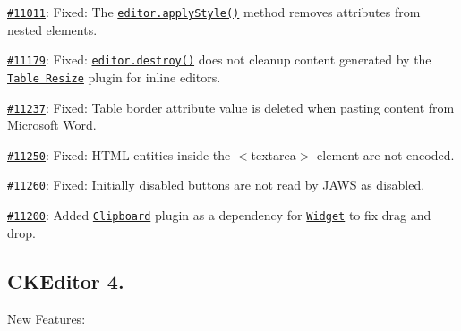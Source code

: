 {\begin{DoxyItemize}
\item \href{http://dev.ckeditor.com/ticket/11011}{\tt \#11011}\+: Fixed\+: The \href{http://docs.ckeditor.com/#!/api/CKEDITOR.editor-method-applyStyle}{\tt {\ttfamily editor.\+apply\+Style()}} method removes attributes from nested elements.
\item \href{http://dev.ckeditor.com/ticket/11179}{\tt \#11179}\+: Fixed\+: \href{http://docs.ckeditor.com/#!/api/CKEDITOR.editor-method-destroy}{\tt {\ttfamily editor.\+destroy()}} does not cleanup content generated by the \href{http://ckeditor.com/addon/tableresize}{\tt Table Resize} plugin for inline editors.
\item \href{http://dev.ckeditor.com/ticket/11237}{\tt \#11237}\+: Fixed\+: Table border attribute value is deleted when pasting content from Microsoft Word.
\item \href{http://dev.ckeditor.com/ticket/11250}{\tt \#11250}\+: Fixed\+: H\+T\+ML entities inside the {\ttfamily $<$textarea$>$} element are not encoded.
\item \href{http://dev.ckeditor.com/ticket/11260}{\tt \#11260}\+: Fixed\+: Initially disabled buttons are not read by J\+A\+WS as disabled.
\item \href{http://dev.ckeditor.com/ticket/11200}{\tt \#11200}\+: Added \href{http://ckeditor.com/addon/clipboard}{\tt Clipboard} plugin as a dependency for \href{http://ckeditor.com/addon/widget}{\tt Widget} to fix drag and drop.
\end{DoxyItemize}}

{\ttfamily \subsection*{C\+K\+Editor 4.}}

{\ttfamily }

{\ttfamily New Features\+:}

